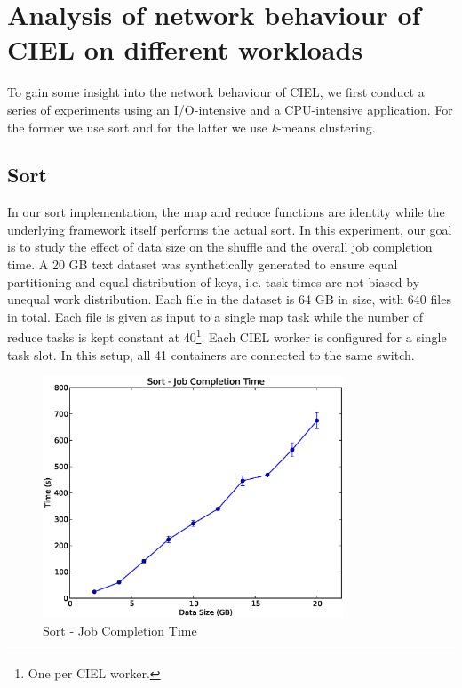 \documentclass[a4paper,12pt,twoside,openright]{report}
\begin{document}
\section{Analysis of network behaviour of CIEL on different workloads}
To gain some insight into the network behaviour of CIEL, we first conduct a
series of experiments using an I/O-intensive and a CPU-intensive application.
For the former we use sort and for the latter we use \emph{k}-means clustering.

\subsection{Sort}
In our sort implementation, the map and reduce functions are identity while the
underlying framework itself performs the actual sort. In this experiment, our
goal is to study the effect of data size on the shuffle and the overall job
completion time. A 20 GB text dataset was synthetically generated to ensure
equal partitioning and equal distribution of keys, i.e. task times are not
biased by unequal work distribution. Each file in the dataset is 64 GB in size,
with 640 files in total. Each file is given as input to a single map task while
the number of reduce tasks is kept constant at 40\footnote{One per CIEL
worker.}. Each CIEL worker is configured for a single task slot. In this setup,
all 41 containers are connected to the same switch.

\begin{figure}[h!]
  \centering
    \includegraphics[width=0.8\textwidth]{sort.eps}
    \caption{Sort - Job Completion Time}
    \label{chap:eval:sec:ciel:fig:sort}
\end{figure}
\end{document}

